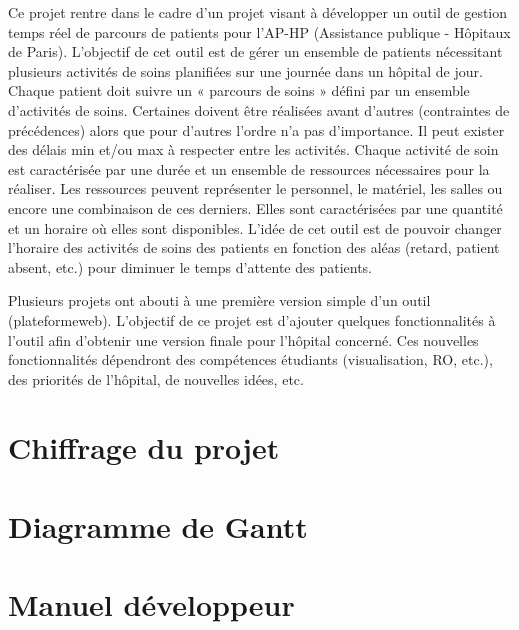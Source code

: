 \documentclass{polytech/polytech}
\begin{document}
Ce projet rentre dans le cadre d’un projet visant à développer un outil de gestion temps réel de parcours de patients pour l’AP-HP (Assistance publique - Hôpitaux de Paris).  L'objectif de cet outil est de gérer un ensemble de patients nécessitant plusieurs activités de soins planifiées sur une journée dans un hôpital de jour. Chaque patient doit suivre un « parcours de soins » défini par un ensemble d’activités de soins. Certaines doivent être réalisées avant d’autres (contraintes de précédences) alors que pour d'autres l’ordre n’a pas d’importance. Il peut exister des délais min et/ou max à respecter entre les activités. Chaque activité de soin est caractérisée par une durée et un ensemble de ressources nécessaires pour la réaliser. Les ressources peuvent représenter le personnel, le matériel, les salles ou encore une combinaison de ces derniers. Elles sont caractérisées par une quantité et un horaire où elles sont disponibles. L’idée de cet outil est de pouvoir changer l’horaire des activités de soins des patients en fonction des aléas (retard, patient absent, etc.) pour diminuer le temps d’attente des patients.

Plusieurs projets ont abouti à une première version simple d’un outil (plateformeweb). L’objectif de ce projet est d’ajouter quelques fonctionnalités à l'outil afin d’obtenir une version finale pour l’hôpital concerné. Ces nouvelles fonctionnalités dépendront des compétences étudiants (visualisation, RO, etc.), des priorités de l’hôpital, de nouvelles idées, etc.


\appendix

\chapter{Chiffrage du projet}

\chapter{Diagramme de Gantt}

\chapter{Manuel développeur}
\end{document}
